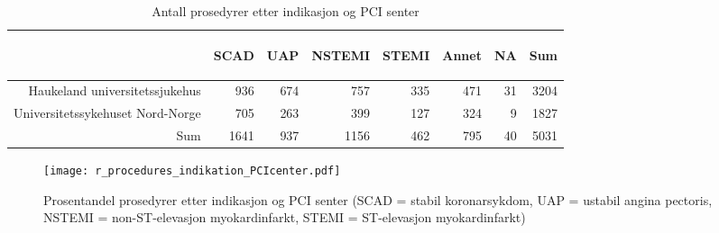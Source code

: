 \documentclass[norsk, a4paper]{report}
\begin{document}
\begin{tiny}
\begin{table}[ht]
\centering
\begin{tabular}{rrrrrrrr}
  \toprule
 & \begin{sideways} SCAD \end{sideways} & \begin{sideways} UAP \end{sideways} & \begin{sideways} NSTEMI \end{sideways} & \begin{sideways} STEMI \end{sideways} & \begin{sideways} Annet \end{sideways} & \begin{sideways} NA \end{sideways} & \begin{sideways} Sum \end{sideways} \\ 
  \midrule
Haukeland universitetssjukehus & 936 & 674 & 757 & 335 & 471 & 31 & 3204 \\ 
  Universitetssykehuset Nord-Norge & 705 & 263 & 399 & 127 & 324 & 9 & 1827 \\ 
  Sum & 1641 & 937 & 1156 & 462 & 795 & 40 & 5031 \\ 
   \bottomrule
\end{tabular}
\caption{Antall prosedyrer etter indikasjon og PCI senter} 
\end{table}\end{tiny}

\clearpage



\begin{figure}[ht]
  \centering
\texttt{[image: r\_procedures\_indikation\_PCIcenter.pdf]}  \caption{Prosentandel prosedyrer etter indikasjon og PCI senter (SCAD = stabil koronarsykdom, UAP = ustabil angina pectoris, NSTEMI = non-ST-elevasjon myokardinfarkt, STEMI = ST-elevasjon myokardinfarkt)}
\end{figure}
\end{document}

